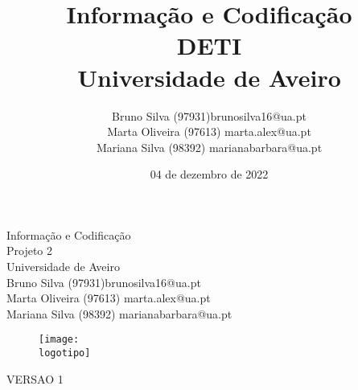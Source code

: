 \documentclass{report}
\begin{document}
%
\def\titulo{Informação e Codificação}
\def\subtitle{Projeto 2}
\def\data{04 de dezembro de 2022}
\def\autores{Bruno Silva (97931)brunosilva16@ua.pt \\ Marta Oliveira (97613) marta.alex@ua.pt \\ Mariana Silva (98392) marianabarbara@ua.pt}
\def\versao{VERSAO 1}
\def\departamento{DETI}
\def\empresa{Universidade de Aveiro}
\def\logotipo{ua.pdf}
%
%
\renewcommand{\contentsname}{Índice}
\begin{titlepage}

\begin{center}
%
\vspace*{15mm}
%
{\Huge \titulo}\\
%
\vspace{10mm}
%
{\Huge \subtitle}\\
%
\vspace{10mm}
%
{\Large \empresa}\\
%
\vspace{10mm}
%
{\LARGE \autores}\\ 
%
\vspace{10mm}
%
\begin{figure}[h]
\center
\texttt{[image: \\logotipo]}
\end{figure}
%
\vspace{30mm}
\end{center}
%
\begin{flushright}
\versao
\end{flushright}
\end{titlepage}

\title{%
{\Huge\textbf{\titulo}}\\
{\Large \departamento\\ \empresa}
}
%
\author{%
    \autores
}
%
\date{\data}
%
\maketitle






\tableofcontents
\end{document}

